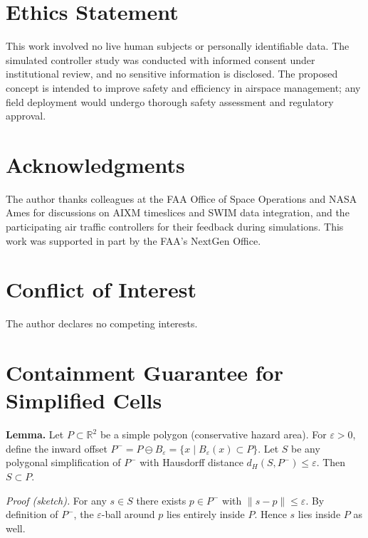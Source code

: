 \documentclass[journal]{new-aiaa}
\newcommand{\AIXM}{\textsc{AIXM}}
\newcommand{\SWIM}{\textsc{SWIM}}
\begin{document}
\section*{Ethics Statement}
This work involved no live human subjects or personally identifiable data. The simulated controller study was conducted with informed consent under institutional review, and no sensitive information is disclosed. The proposed concept is intended to improve safety and efficiency in airspace management; any field deployment would undergo thorough safety assessment and regulatory approval.

\section*{Acknowledgments}
The author thanks colleagues at the FAA Office of Space Operations and NASA Ames for discussions on \AIXM{} timeslices and \SWIM{} data integration, and the participating air traffic controllers for their feedback during simulations. This work was supported in part by the FAA’s NextGen Office.

\section*{Conflict of Interest}
The author declares no competing interests.

\appendix

\section{Containment Guarantee for Simplified Cells}
\label{app:containment}
\textbf{Lemma.} Let $P \subset \mathbb{R}^2$ be a simple polygon (conservative hazard area). For $\varepsilon>0$, define the inward offset $P^- = P \ominus B_\varepsilon = \{x \mid B_\varepsilon(x)\subset P\}$. Let $S$ be any polygonal simplification of $P^-$ with Hausdorff distance $d_H(S,P^-)\le \varepsilon$. Then $S \subset P$. 

\textit{Proof (sketch).} For any $s\in S$ there exists $p\in P^-$ with $\|s-p\|\le\varepsilon$. By definition of $P^-$, the $\varepsilon$-ball around $p$ lies entirely inside $P$. Hence $s$ lies inside $P$ as well.
\end{document}
